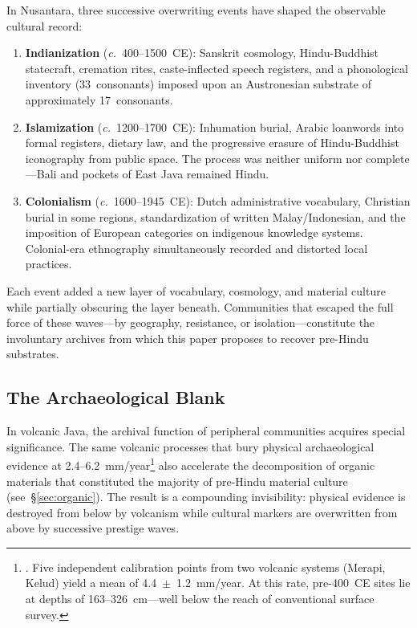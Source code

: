 \documentclass[12pt,a4paper]{article}
\begin{document}
In Nusantara, three successive overwriting events have shaped the observable cultural record:

\begin{enumerate}
\item \textbf{Indianization} (\textit{c.}~400--1500~CE): Sanskrit cosmology, Hindu-Buddhist statecraft, cremation rites, caste-inflected speech registers, and a phonological inventory (33~consonants) imposed upon an Austronesian substrate of approximately 17~consonants.

\item \textbf{Islamization} (\textit{c.}~1200--1700~CE): Inhumation burial, Arabic loanwords into formal registers, dietary law, and the progressive erasure of Hindu-Buddhist iconography from public space. The process was neither uniform nor complete---Bali and pockets of East Java remained Hindu.

\item \textbf{Colonialism} (\textit{c.}~1600--1945~CE): Dutch administrative vocabulary, Christian burial in some regions, standardization of written Malay/Indonesian, and the imposition of European categories on indigenous knowledge systems. Colonial-era ethnography simultaneously recorded and distorted local practices.
\end{enumerate}

Each event added a new layer of vocabulary, cosmology, and material culture while partially obscuring the layer beneath. Communities that escaped the full force of these waves---by geography, resistance, or isolation---constitute the involuntary archives from which this paper proposes to recover pre-Hindu substrates.

\subsection{The Archaeological Blank}

In volcanic Java, the archival function of peripheral communities acquires special significance. The same volcanic processes that bury physical archaeological evidence at 2.4--6.2~mm/year\footnote{\autocite{amien2026a}. Five independent calibration points from two volcanic systems (Merapi, Kelud) yield a mean of 4.4~$\pm$~1.2~mm/year. At this rate, pre-400~CE sites lie at depths of 163--326~cm---well below the reach of conventional surface survey.} also accelerate the decomposition of organic materials that constituted the majority of pre-Hindu material culture (see~\S\ref{sec:organic}). The result is a compounding invisibility: physical evidence is destroyed from below by volcanism while cultural markers are overwritten from above by successive prestige waves.
\end{document}
